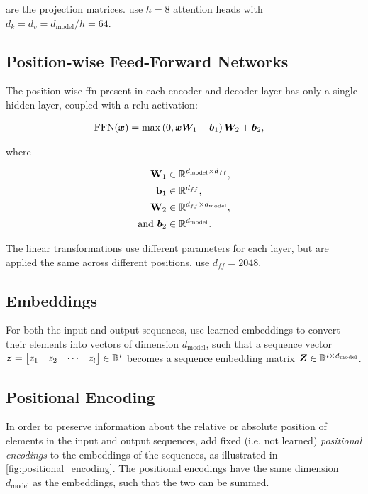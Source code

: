 are the projection matrices. \citet{vaswani2017attention} use $h = 8$ attention heads with $d_k = d_v = d_{\text{model}} / h = 64$.

\subsection{Position-wise Feed-Forward Networks}
\label{subsec:position_wise_ffn}
The position-wise \gls{ffn} present in each encoder and decoder layer has only a single hidden layer, coupled with a \gls{relu} activation:

\begin{align}
    \text{FFN}(\xvect) &= \max\left( 0, \xvect \Wvect_1 + \vect{b}_1 \right) \Wvect_2 + \vect{b}_2,
\end{align}

where 

\begin{align*}
    \Wvect_1 &\in \reals{d_{\text{model}} \times d_{ff}}, \\
    \vect{b}_1 &\in \reals{d_{ff}}, \\
    \Wvect_2 &\in \reals{d_{ff} \times d_{\text{model}}}, \\
    \text{and } \vect{b}_2 &\in \reals{d_{\text{model}}}.
\end{align*}

The linear transformations use different parameters for each layer, but are applied the same across different positions. \citet{vaswani2017attention} use $d_{ff} = 2048$.

\subsection{Embeddings}
\label{subsec:embeddings}
For both the input and output sequences, \citet{vaswani2017attention} use learned embeddings to convert their elements into vectors of dimension $d_{\text{model}}$, such that a sequence vector $\vect{z} = \begin{bmatrix}z_1 & z_2 & \cdots & z_l\end{bmatrix} \in \reals{l}$ becomes a sequence embedding matrix $\vect{Z} \in \reals{l \times d_{\text{model}}}$.

\subsection{Positional Encoding}
\label{subsec:positional_encoding}
In order to preserve information about the relative or absolute position of elements in the input and output sequences, \citet{vaswani2017attention} add fixed (i.e. not learned) \emph{positional encodings} to the embeddings of the sequences, as illustrated in \cref{fig:positional_encoding}. The positional encodings have the same dimension $d_{\text{model}}$ as the embeddings, such that the two can be summed.

